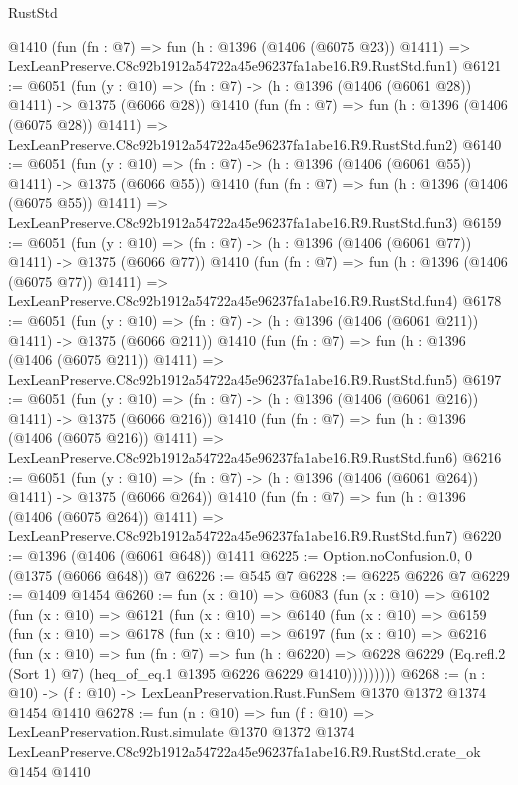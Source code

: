 \begin{lexlean}{RustStd}
\begin{coremodule}
    @1410
    (fun (fn : @7) =>
    fun (h : @1396 (@1406 (@6075 @23)) @1411) =>
    LexLeanPreserve.C8c92b1912a54722a45e96237fa1abe16.R9.RustStd.fun1)
@6121 := @6051
    (fun (y : @10) => (fn : @7) -> (h : @1396 (@1406 (@6061 @28)) @1411) -> @1375 (@6066 @28))
    @1410
    (fun (fn : @7) =>
    fun (h : @1396 (@1406 (@6075 @28)) @1411) =>
    LexLeanPreserve.C8c92b1912a54722a45e96237fa1abe16.R9.RustStd.fun2)
@6140 := @6051
    (fun (y : @10) => (fn : @7) -> (h : @1396 (@1406 (@6061 @55)) @1411) -> @1375 (@6066 @55))
    @1410
    (fun (fn : @7) =>
    fun (h : @1396 (@1406 (@6075 @55)) @1411) =>
    LexLeanPreserve.C8c92b1912a54722a45e96237fa1abe16.R9.RustStd.fun3)
@6159 := @6051
    (fun (y : @10) => (fn : @7) -> (h : @1396 (@1406 (@6061 @77)) @1411) -> @1375 (@6066 @77))
    @1410
    (fun (fn : @7) =>
    fun (h : @1396 (@1406 (@6075 @77)) @1411) =>
    LexLeanPreserve.C8c92b1912a54722a45e96237fa1abe16.R9.RustStd.fun4)
@6178 := @6051
    (fun (y : @10) => (fn : @7) -> (h : @1396 (@1406 (@6061 @211)) @1411) -> @1375 (@6066 @211))
    @1410
    (fun (fn : @7) =>
    fun (h : @1396 (@1406 (@6075 @211)) @1411) =>
    LexLeanPreserve.C8c92b1912a54722a45e96237fa1abe16.R9.RustStd.fun5)
@6197 := @6051
    (fun (y : @10) => (fn : @7) -> (h : @1396 (@1406 (@6061 @216)) @1411) -> @1375 (@6066 @216))
    @1410
    (fun (fn : @7) =>
    fun (h : @1396 (@1406 (@6075 @216)) @1411) =>
    LexLeanPreserve.C8c92b1912a54722a45e96237fa1abe16.R9.RustStd.fun6)
@6216 := @6051
    (fun (y : @10) => (fn : @7) -> (h : @1396 (@1406 (@6061 @264)) @1411) -> @1375 (@6066 @264))
    @1410
    (fun (fn : @7) =>
    fun (h : @1396 (@1406 (@6075 @264)) @1411) =>
    LexLeanPreserve.C8c92b1912a54722a45e96237fa1abe16.R9.RustStd.fun7)
@6220 := @1396 (@1406 (@6061 @648)) @1411
@6225 := Option.noConfusion.{0, 0} (@1375 (@6066 @648)) @7
@6226 := @545 @7
@6228 := @6225 @6226 @7
@6229 := @1409 @1454
@6260 := fun (x : @10) =>
  @6083
    (fun (x : @10) =>
    @6102
      (fun (x : @10) =>
      @6121
        (fun (x : @10) =>
        @6140
          (fun (x : @10) =>
          @6159
            (fun (x : @10) =>
            @6178
              (fun (x : @10) =>
              @6197
                (fun (x : @10) =>
                @6216
                  (fun (x : @10) =>
                  fun (fn : @7) =>
                  fun (h : @6220) =>
                  @6228
                    @6229
                    (Eq.refl.{2} (Sort 1) @7)
                    (heq_of_eq.{1} @1395 @6226 @6229 @1410)))))))))
@6268 := (n : @10) -> (f : @10) -> LexLeanPreservation.Rust.FunSem @1370 @1372 @1374 @1454 @1410
@6278 := fun (n : @10) =>
  fun (f : @10) =>
  LexLeanPreservation.Rust.simulate
    @1370
    @1372
    @1374
    LexLeanPreserve.C8c92b1912a54722a45e96237fa1abe16.R9.RustStd.crate_ok
    @1454
    @1410
\end{coremodule}
\end{lexlean}
